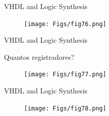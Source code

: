\documentclass[aspectratio=169]{beamer}
\begin{document}
\begin{frame}{VHDL and Logic Synthesis}
	\justifying
	
	
	\begin{figure}[h]
		\centering
		\texttt{[image: Figs/fig76.png]}
	\end{figure}
	
\end{frame}
\begin{frame}{VHDL and Logic Synthesis}
	\justifying
	
	Quantos registradores?
	
	\begin{figure}[h]
		\centering
		\texttt{[image: Figs/fig77.png]}
	\end{figure}
	
\end{frame}
\begin{frame}{VHDL and Logic Synthesis}
	\justifying
	
	
	\begin{figure}[h]
		\centering
		\texttt{[image: Figs/fig78.png]}
	\end{figure}
	
\end{frame}
\end{document}
